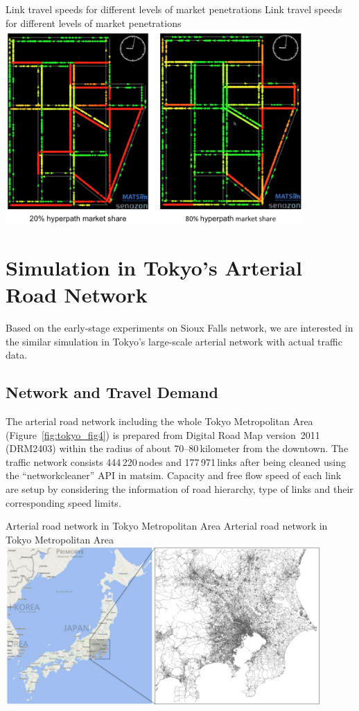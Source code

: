 \createfigure%
{Link travel speeds for different levels of market penetrations}%
{Link travel speeds for different levels of market penetrations}%
{\label{fig:tokyo_fig3}}%
{\includegraphics[width=0.85\textwidth, angle=0]{./scenarios/figures/tokyo_fig3.png}}%
{}


\section{Simulation in Tokyo's Arterial Road Network}
Based on the early-stage experiments on Sioux Falls network, we are interested in the similar simulation in Tokyo's large-scale arterial network with actual traffic data. 

\subsection{Network and Travel Demand}
The arterial road network including the whole Tokyo Metropolitan Area (Figure~\ref{fig:tokyo_fig4}) is prepared from Digital Road Map version~2011 (DRM2403) within the radius of about 70--80\,kilometer from the downtown. The traffic network consists 444\,220\,nodes and 177\,971\,links after being cleaned using the ``networkcleaner'' API in \gls{matsim}. Capacity and free flow speed of each link are setup by considering the information of road hierarchy, type of links and their corresponding speed limits. 

\createfigure%
{Arterial road network in Tokyo Metropolitan Area}%
{Arterial road network in Tokyo Metropolitan Area}%
{\label{fig:tokyo_fig4}}%
{\includegraphics[width=0.90\textwidth, angle=0]{./scenarios/figures/tokyo_fig4.png}}%
{}

